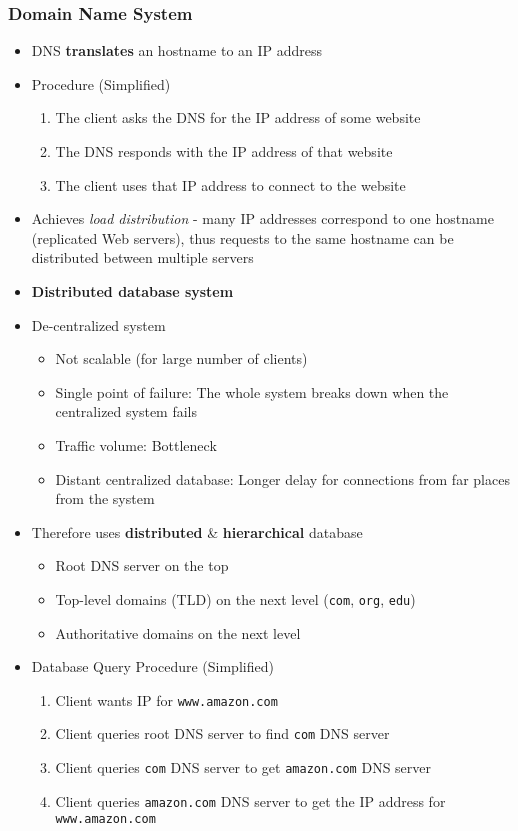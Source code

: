 \subsubsection{Domain Name System}
\begin{itemize}
	\item DNS \textbf{translates} an hostname to an IP address
	\item Procedure (Simplified)
	\begin{enumerate}
		\item The client asks the DNS for the IP address of some website
		\item The DNS responds with the IP address of that website
		\item The client uses that IP address to connect to the website
	\end{enumerate}
	\item Achieves \textit{load distribution} - many IP addresses correspond to one hostname (replicated Web servers), thus requests to the same hostname can be distributed between multiple servers
	\item \textbf{Distributed database system}
	\item De-centralized system
	\begin{itemize}
		\item Not scalable (for large number of clients)
		\item Single point of failure: The whole system breaks down when the centralized system fails
		\item Traffic volume: Bottleneck
		\item Distant centralized database: Longer delay for connections from far places from the system
	\end{itemize}
	\item Therefore uses \textbf{distributed} \& \textbf{hierarchical} database
	\begin{itemize}
		\item Root DNS server on the top
		\item Top-level domains (TLD) on the next level (\texttt{com}, \texttt{org}, \texttt{edu})
		\item Authoritative domains on the next level
	\end{itemize}
	\item Database Query Procedure (Simplified)
	\begin{enumerate}
		\item Client wants IP for \texttt{www.amazon.com}
		\item Client queries root DNS server to find \texttt{com} DNS server
		\item Client queries \texttt{com} DNS server to get \texttt{amazon.com} DNS server
		\item Client queries \texttt{amazon.com} DNS server to get the IP address for \texttt{www.amazon.com}
	\end{enumerate}
\end{itemize}


